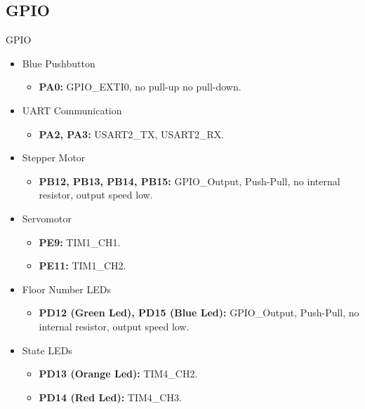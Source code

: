 \documentclass[aspectratio=169]{beamer}
\begin{document}
\subsection{GPIO}
\begin{frame}{GPIO}

\begin{itemize}
    \item Blue Pushbutton 
        \begin{itemize}
            \item \textbf{PA0:} GPIO\_EXTI0, no pull-up no pull-down. 
        \end{itemize}
    
    \item UART Communication
        \begin{itemize}
            \item \textbf{PA2, PA3:} USART2\_TX, USART2\_RX.
        \end{itemize}
    
    \item Stepper Motor
        \begin{itemize}
            \item \textbf{PB12, PB13, PB14, PB15:} GPIO\_Output, Push-Pull, no internal resistor, output speed low.
        \end{itemize}
    
    \item Servomotor
        \begin{itemize}
            \item \textbf{PE9:} TIM1\_CH1.
            \item \textbf{PE11:} TIM1\_CH2.
        \end{itemize}
        
    \item Floor Number LEDs
        \begin{itemize}
            \item \textbf{PD12 (Green Led), PD15 (Blue Led):} GPIO\_Output, Push-Pull, no internal resistor, output speed low.
        \end{itemize}
        
    \item State LEDs
        \begin{itemize}
            \item \textbf{PD13 (Orange Led):} TIM4\_CH2.
            \item \textbf{PD14 (Red Led):} TIM4\_CH3.
        \end{itemize}
        
\end{itemize}
\end{frame}
\end{document}

